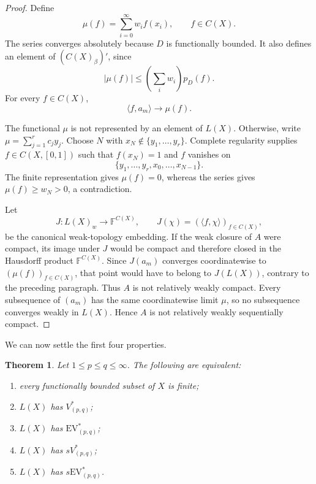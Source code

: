 \documentclass[11pt]{article}
\newtheorem{theorem}{Theorem}[section]
\newcommand{\F}{\mathbb F}
\newcommand{\EV}{\mathrm{EV}}
\begin{document}
\begin{proof}
Define
\[
  \mu(f)=\sum_{i=0}^\infty w_i f(x_i),
  \qquad f\in C(X).
\]
The series converges absolutely because $D$ is functionally bounded.  It also
defines an element of $(C(X)_\beta)'$, since
\[
  |\mu(f)|\leq\left(\sum_iw_i\right)p_D(f).
\]
For every $f\in C(X)$,
\[
  \langle f,a_m\rangle\longrightarrow\mu(f).
\]

The functional $\mu$ is not represented by an element of $L(X)$.  Otherwise,
write $\mu=\sum_{j=1}^r c_jy_j$.  Choose $N$ with
$x_N\notin\{y_1,\dots,y_r\}$.  Complete regularity supplies
$f\in C(X,[0,1])$ such that $f(x_N)=1$ and $f$ vanishes on
\[
  \{y_1,\dots,y_r,x_0,\dots,x_{N-1}\}.
\]
The finite representation gives $\mu(f)=0$, whereas the series gives
$\mu(f)\geq w_N>0$, a contradiction.

Let
\[
  J:L(X)_w\longrightarrow\F^{C(X)},
  \qquad J(\chi)=(\langle f,\chi\rangle)_{f\in C(X)},
\]
be the canonical weak-topology embedding.  If the weak closure of $A$ were
compact, its image under $J$ would be compact and therefore closed in the
Hausdorff product $\F^{C(X)}$.  Since $J(a_m)$ converges coordinatewise to
$(\mu(f))_{f\in C(X)}$, that point would have to belong to $J(L(X))$, contrary
to the preceding paragraph.  Thus $A$ is not relatively weakly compact.
Every subsequence of $(a_m)$ has the same coordinatewise limit $\mu$, so no
subsequence converges weakly in $L(X)$.  Hence $A$ is not relatively weakly
sequentially compact.
\end{proof}

We can now settle the first four properties.

\begin{theorem}\label{thm:four}
Let $1\leq p\leq q\leq\infty$.  The following are equivalent:
\begin{enumerate}[label=\textup{(\roman*)}]
\item every functionally bounded subset of $X$ is finite;
\item $L(X)$ has $V^*_{(p,q)}$;
\item $L(X)$ has $\EV^*_{(p,q)}$;
\item $L(X)$ has $sV^*_{(p,q)}$;
\item $L(X)$ has $s\EV^*_{(p,q)}$.
\end{enumerate}
\end{theorem}
\end{document}
